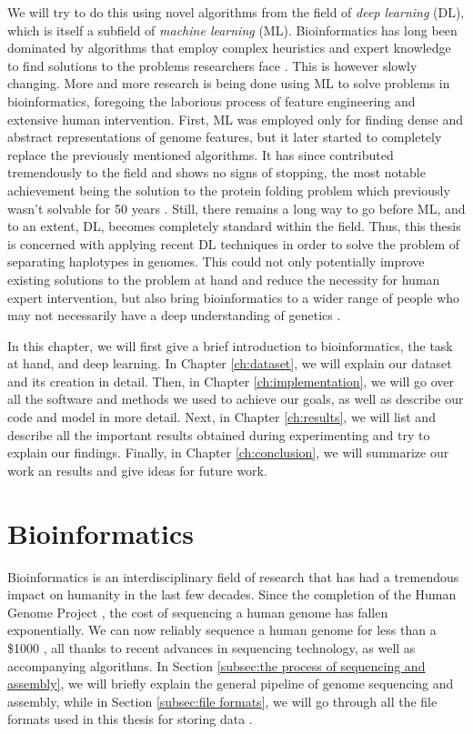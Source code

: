 \documentclass[times, utf8, diplomski, english]{fer_eng}
\begin{document}
We will try to do this using novel algorithms from the field of \textit{deep learning} (DL), which is itself a subfield of \textit{machine learning} (ML). Bioinformatics has long been dominated by algorithms that employ complex heuristics and expert knowledge to find solutions to the problems researchers face \cite{compeau_pevzner_2015}. This is however slowly changing. More and more research is being done using ML to solve problems in bioinformatics, foregoing the laborious process of feature engineering and extensive human intervention. First, ML was employed only for finding dense and abstract representations of genome features, but it later started to completely replace the previously mentioned algorithms. It has since contributed tremendously to the field and shows no signs of stopping, the most notable achievement being the solution to the protein folding problem which previously wasn't solvable for 50 years \cite{alphafold}. Still, there remains a long way to go before ML, and to an extent, DL, becomes completely standard within the field. Thus, this thesis is concerned with applying recent DL techniques in order to solve the problem of separating haplotypes in genomes. This could not only potentially improve existing solutions to the problem at hand and reduce the necessity for human expert intervention, but also bring bioinformatics to a wider range of people who may not necessarily have a deep understanding of genetics \cite{dl_bioinformatics}.

In this chapter, we will first give a brief introduction to bioinformatics, the task at hand, and deep learning. In Chapter \ref{ch:dataset}, we will explain our dataset and its creation in detail. Then, in Chapter \ref{ch:implementation}, we will go over all the software and methods we used to achieve our goals, as well as describe our code and model in more detail. Next, in Chapter \ref{ch:results}, we will list and describe all the important results obtained during experimenting and try to explain our findings. Finally, in Chapter \ref{ch:conclusion}, we will summarize our work an results and give ideas for future work.

\section{Bioinformatics}

Bioinformatics is an interdisciplinary field of research that has had a tremendous impact on humanity in the last few decades. Since the completion of the Human Genome Project \cite{HGP1} \cite{HGP2}, the cost of sequencing a human genome has fallen exponentially. We can now reliably sequence a human genome for less than a \$1000 \cite{genome_cost}, all thanks to recent advances in sequencing technology, as well as accompanying algorithms. In Section \ref{subsec:the process of sequencing and assembly}, we will briefly explain the general pipeline of genome sequencing and assembly, while in Section \ref{subsec:file formats}, we will go through all the file formats used in this thesis for storing data	.
\end{document}
